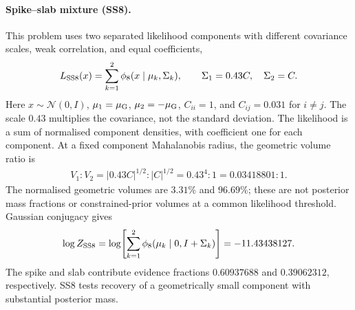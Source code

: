 \documentclass[pdflatex,sn-basic,icol]{sn-jnl}
\theoremstyle{plain}
\theoremstyle{definition}
\begin{document}
\paragraph{Spike--slab mixture (SS8).}
This problem uses two separated likelihood components with different covariance scales, weak correlation, and equal coefficients,
\begin{align}
    L_{\rm SS8}(x) = \sum_{k=1}^{2}\phi_8(x\mid\mu_k,\Sigma_k),
    \qquad \Sigma_1=0.43C,\quad\Sigma_2=C. \label{eq:ss8_likelihood}
\end{align}
Here $x\sim\mathcal{N}(0,I)$, $\mu_1=\mu_{\rm G}$, $\mu_2=-\mu_{\rm G}$, $C_{ii}=1$, and $C_{ij}=0.031$ for $i\ne j$.
The scale $0.43$ multiplies the covariance, not the standard deviation.
The likelihood is a sum of normalised component densities, with coefficient one for each component.
At a fixed component Mahalanobis radius, the geometric volume ratio is
\begin{align}
    V_1:V_2=|0.43C|^{1/2}:|C|^{1/2}=0.43^4:1
    =0.03418801:1. \label{eq:ss8_relative_volume}
\end{align}
The normalised geometric volumes are $3.31\%$ and $96.69\%$; these are not posterior mass fractions or constrained-prior volumes at a common likelihood threshold.
Gaussian conjugacy gives
\begin{align}
    \log Z_{\rm SS8}=\log\!\left[\sum_{k=1}^{2}\phi_8(\mu_k\mid0,I+\Sigma_k)\right]
    = -11.43438127. \label{eq:ss8_evidence}
\end{align}
The spike and slab contribute evidence fractions $0.60937688$ and $0.39062312$, respectively.
SS8 tests recovery of a geometrically small component with substantial posterior mass.
\end{document}
